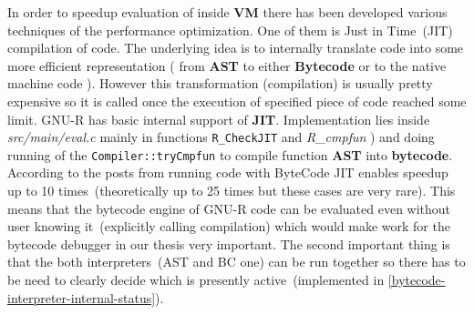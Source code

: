 \documentclass[thesis=M,english]{FITthesis}[2018/10/20]
\newcommand{\code}[1]{\texttt{#1}}
\begin{document}
In order to speedup evaluation of inside \textbf{VM} there has been developed various techniques of the performance optimization. One of them is Just in Time~(JIT) compilation of code. The underlying idea is to internally translate code into some more efficient representation ( from \textbf{AST} to either \textbf{Bytecode} or to the native machine code ). However this transformation (compilation) is usually pretty expensive so it is called once the execution of specified piece of code reached some limit.
GNU-R has basic internal support of \textbf{JIT}. Implementation lies inside \textit{src/main/eval.c} mainly in functions \code{R{\_}CheckJIT} and \textit{R{\_}cmpfun} ) and doing running of the \code{Compiler::tryCmpfun} to compile function \textbf{AST} into \textbf{bytecode}. According to the posts from running code with ByteCode JIT enables speedup up to 10 times~(theoretically up to 25 times but these cases are very rare).
This means that the bytecode engine of GNU-R code can be evaluated even without user knowing it~(explicitly calling compilation) which would make work for the bytecode debugger in our thesis very important. The second important thing is that the both interpreters~(AST and BC one) can be run together so there has to be need to clearly decide which is presently active~(implemented in \ref{bytecode-interpreter-internal-status}).


%
%
%
%
%
%
%
%
%
%
%
%
%
%
%
\end{document}
